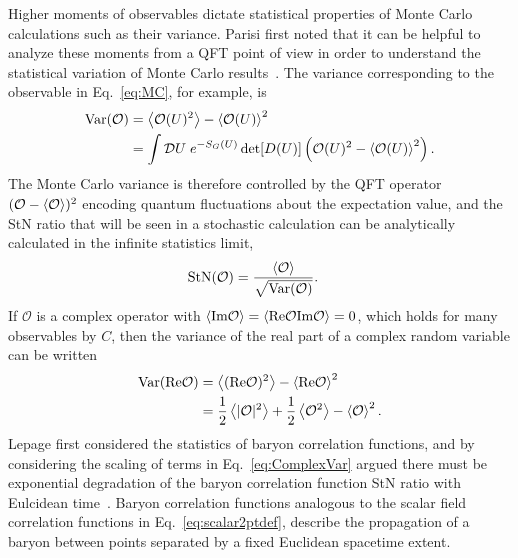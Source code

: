 Higher moments of observables dictate statistical properties of Monte Carlo calculations such as their variance.
Parisi first noted that it can be helpful to analyze these moments from a QFT point of view in order to understand the statistical variation of Monte Carlo results~\cite{Parisi:1983ae}.
The variance corresponding to the observable in Eq.~\eqref{eq:MC}, for example, is
\begin{equation}
  \begin{split}
    \text{Var}(\mathcal{O}) &= \left< \mathcal{O}(U)^2 \right> - \left< \mathcal{O}(U) \right>^2 \\
    &= \int \mathcal{D}U\;e^{-S_G(U)}\det[D(U)] \left(\mathcal{O}(U)^2 - \left< \mathcal{O}(U) \right>^2\right).
  \end{split}\label{eq:MCvar}
\end{equation}
The Monte Carlo variance is therefore controlled by the QFT operator $(\mathcal{O} - \left< \mathcal{O} \right>)^2$ encoding quantum fluctuations about the expectation value, and the StN ratio that will be seen in a stochastic calculation can be analytically calculated in the infinite statistics limit,
\begin{equation}
  \begin{split}
    \text{StN}(\mathcal{O}) &= \frac{\left< \mathcal{O} \right>}{\sqrt{\text{Var}(\mathcal{O})}}.
  \end{split}\label{eq:MCstn}
\end{equation}
If $\mathcal{O}$ is a complex operator with $\left< \text{Im}\mathcal{O} \right> = \left< \text{Re}\mathcal{O}\text{Im}\mathcal{O} \right>=0$, which holds for many observables by $C$, then the variance of the real part of a complex random variable can be written
\begin{equation}
  \begin{split}
    \text{Var}(\text{Re}\mathcal{O}) &= \left< (\text{Re}\mathcal{O})^2 \right> - \left< \text{Re}\mathcal{O} \right>^2\\
    &= \frac{1}{2}\left< |\mathcal{O}|^2 \right> + \frac{1}{2}\left< \mathcal{O}^2 \right> - \left< \mathcal{O} \right>^2.
  \end{split}\label{eq:ComplexVar}
\end{equation}
Lepage first considered the statistics of baryon correlation functions, and by considering the scaling of terms in Eq.~\eqref{eq:ComplexVar} argued there must be exponential degradation of the baryon correlation function StN ratio with Eulcidean time~\cite{Lepage:1989hd}.
Baryon correlation functions analogous to the scalar field correlation functions in Eq.~\eqref{eq:scalar2ptdef}, describe the propagation of a baryon between points separated by a fixed Euclidean spacetime extent.
